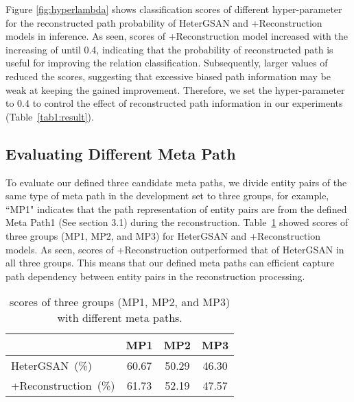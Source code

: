 \documentclass[letterpaper]{article} \usepackage{aaai21}  \usepackage{times}  \usepackage{helvet} \usepackage{courier}  \usepackage[hyphens]{url}  \usepackage{graphicx} \urlstyle{rm} \def\UrlFont{\rm}  \usepackage{natbib}  \usepackage{caption} \frenchspacing  \setlength{\pdfpagewidth}{8.5in}  \setlength{\pdfpageheight}{11in}  \usepackage{amsmath}
\begin{document}
Figure \ref{fig:hyperlambda} shows classification  scores of different hyper-parameter  for the reconstructed path probability of HeterGSAN and +Reconstruction models in inference.
As seen,  scores of +Reconstruction model increased with the increasing of  until 0.4, indicating that the probability of reconstructed path is useful for improving the relation classification.
Subsequently, larger values of  reduced the  scores, suggesting that excessive biased path information may be weak at keeping the gained improvement.
Therefore, we set the hyper-parameter  to 0.4 to control the effect of reconstructed path information in our experiments (Table~\ref{tab1:result}).


\subsection{Evaluating Different Meta Path}
To evaluate our defined three candidate meta paths, we divide entity pairs of the same type of meta path in the development set to three groups, for example, ``MP1" indicates that the path representation of entity pairs are from the defined Meta Path1 (See section 3.1) during the reconstruction.   
Table~\ref{tab5:pathlen} showed  scores of three groups (MP1, MP2, and MP3) for HeterGSAN and +Reconstruction models.
As seen,  scores of +Reconstruction outperformed that of HeterGSAN in all three groups.
This means that our defined meta paths can efficient capture path dependency between entity pairs in the reconstruction processing.
\begin{table}[h]
    \begin{center}
        \begin{tabular}{l|c|c|c}
& MP1 & MP2 & MP3 \\ \hline
        HeterGSAN~(\%)       & 60.67                      & 50.29 & 46.30 \\
        \;\;\;\;+Reconstruction~(\%) & 61.73                      & 52.19 & 47.57 \\ \end{tabular}
    \end{center}
    \caption{\label{tab5:pathlen} scores of three groups (MP1, MP2, and MP3) with different meta paths.}
\end{table}
\end{document}

